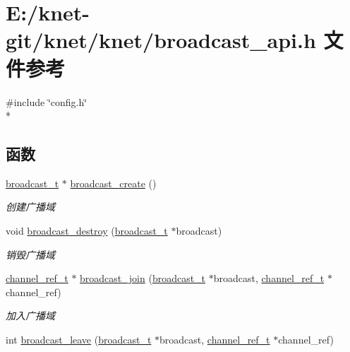 \hypertarget{a00042}{}\section{E\+:/knet-\/git/knet/knet/broadcast\+\_\+api.h 文件参考}
\label{a00042}
{\ttfamily \#include \char`\"{}config.\+h\char`\"{}}\\*
\subsection*{函数}
\begin{DoxyCompactItemize}
\item 
\hyperlink{a00050_ac970c5deaf6417a866aabed01cd57b1b_ac970c5deaf6417a866aabed01cd57b1b}{broadcast\+\_\+t} $\ast$ \hyperlink{a00100_gaa3b09fb6ff3281cb10736c0aabac18fc_gaa3b09fb6ff3281cb10736c0aabac18fc}{broadcast\+\_\+create} ()
\begin{DoxyCompactList}\small\item\em 创建广播域 \end{DoxyCompactList}\item 
void \hyperlink{a00100_gaa28451fa4656633ded0c7b966ff159c3_gaa28451fa4656633ded0c7b966ff159c3}{broadcast\+\_\+destroy} (\hyperlink{a00050_ac970c5deaf6417a866aabed01cd57b1b_ac970c5deaf6417a866aabed01cd57b1b}{broadcast\+\_\+t} $\ast$broadcast)
\begin{DoxyCompactList}\small\item\em 销毁广播域 \end{DoxyCompactList}\item 
\hyperlink{a00050_a151271c9d188ef28d4d24bb81dcc1263_a151271c9d188ef28d4d24bb81dcc1263}{channel\+\_\+ref\+\_\+t} $\ast$ \hyperlink{a00100_ga1c736809a1d0e4b7c77b617ac8ce590d_ga1c736809a1d0e4b7c77b617ac8ce590d}{broadcast\+\_\+join} (\hyperlink{a00050_ac970c5deaf6417a866aabed01cd57b1b_ac970c5deaf6417a866aabed01cd57b1b}{broadcast\+\_\+t} $\ast$broadcast, \hyperlink{a00050_a151271c9d188ef28d4d24bb81dcc1263_a151271c9d188ef28d4d24bb81dcc1263}{channel\+\_\+ref\+\_\+t} $\ast$channel\+\_\+ref)
\begin{DoxyCompactList}\small\item\em 加入广播域 \end{DoxyCompactList}\item 
int \hyperlink{a00100_gad846ced37d33b750f61a88565eaed9a4_gad846ced37d33b750f61a88565eaed9a4}{broadcast\+\_\+leave} (\hyperlink{a00050_ac970c5deaf6417a866aabed01cd57b1b_ac970c5deaf6417a866aabed01cd57b1b}{broadcast\+\_\+t} $\ast$broadcast, \hyperlink{a00050_a151271c9d188ef28d4d24bb81dcc1263_a151271c9d188ef28d4d24bb81dcc1263}{channel\+\_\+ref\+\_\+t} $\ast$channel\+\_\+ref)

\end{DoxyCompactItemize}
